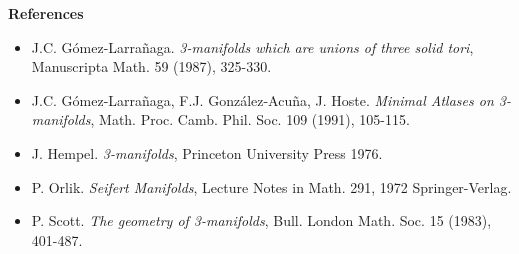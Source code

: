 \documentclass[12pt]{article}
\begin{document}
{\bf References}
\begin{itemize}
\item  J.C. G\'omez-Larra\~naga. {\it 3-manifolds which are unions of three solid tori},
Manuscripta Math. 59 (1987), 325-330.
\item  J.C. G\'omez-Larra\~naga, F.J. Gonz\'alez-Acu\~na, J. Hoste.
{\it Minimal Atlases on 3-manifolds},
Math. Proc. Camb. Phil. Soc. 109 (1991), 105-115.
\item  J. Hempel. {\it 3-manifolds}, Princeton University Press 1976.
\item  P. Orlik. {\it Seifert Manifolds}, Lecture Notes in Math. 291,
1972 Springer-Verlag.
\item  P. Scott. {\it The geometry of 3-manifolds}, Bull. London Math. Soc. 15 (1983), 401-487.
\end{itemize}
\end{document}
